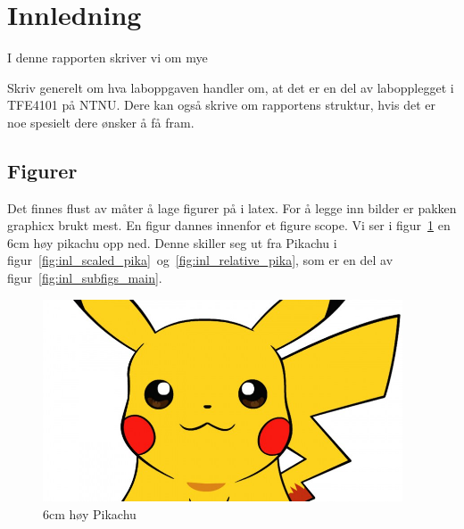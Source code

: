 \section{Innledning}

I denne rapporten skriver vi om mye

Skriv generelt om hva laboppgaven handler om, at det er en del av labopplegget i TFE4101 på NTNU. 
Dere kan også skrive om rapportens struktur, hvis det er noe spesielt dere ønsker å få fram.

\subsection{Figurer}

Det finnes flust av måter å lage figurer på i latex. For å legge inn bilder er pakken graphicx brukt mest. En figur dannes innenfor et figure scope. 
Vi ser i figur~\ref{fig:inl_6cm_pika} en 6cm høy pikachu opp ned. Denne skiller seg ut fra Pikachu i figur~\ref{fig:inl_scaled_pika}~og~\ref{fig:inl_relative_pika}, som er en del av figur~\ref{fig:inl_subfigs_main}.



\begin{figure}[!htb]
    \centering
    
    \includegraphics[height=6cm, angle=180]{figurer/pika.jpg}
    \caption{6cm høy Pikachu}
    \label{fig:inl_6cm_pika}
\end{figure}

